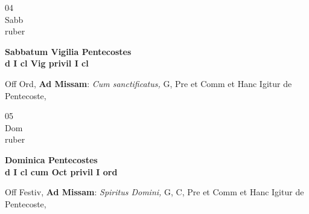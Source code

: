 \documentclass[10pt, openany]{book}
\begin{document}
        \begin{center}
            \begin{minipage}{3.5in}
                \vspace{2em}
                \begin{minipage}{0.5in}
                    {\Huge 04} \\
                    {\normalsize Sabb} \\
                    {\normalsize ruber}
                \end{minipage}
                \begin{minipage}{3.0in}
                    \textbf{ \large Sabbatum Vigilia Pentecostes \\
                    \textnormal{\normalsize d I cl Vig privil I cl}} \\ 
                \end{minipage}
                \begin{justify}Off Ord, \textbf{Ad Missam}: \textit{Cum sanctificatus,} G, Pre et Comm et Hanc Igitur de Pentecoste,   
                \end{justify}
            \end{minipage}
        \end{center}
    
        \begin{center}
            \begin{minipage}{3.5in}
                \vspace{2em}
                \begin{minipage}{0.5in}
                    {\Huge 05} \\
                    {\normalsize Dom} \\
                    {\normalsize ruber}
                \end{minipage}
                \begin{minipage}{3.0in}
                    \textbf{ \large Dominica Pentecostes \\
                    \textnormal{\normalsize d I cl cum Oct privil I ord}} \\ 
                \end{minipage}
                \begin{justify}Off Festiv, \textbf{Ad Missam}: \textit{Spiritus Domini,} G, C, Pre et Comm et Hanc Igitur de Pentecoste,   
                \end{justify}
            \end{minipage}
        \end{center}
    
\end{document}

